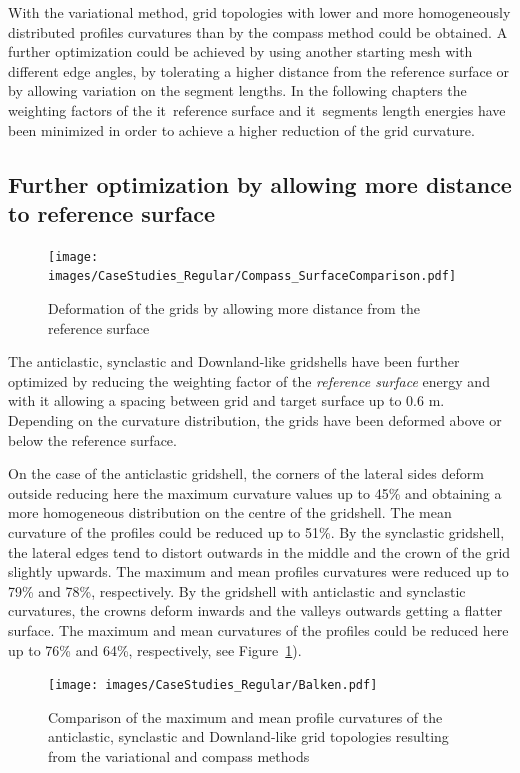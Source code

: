 \documentclass[Thesis.tex]{subfiles}
\begin{document}
With the variational method, grid topologies with lower and more homogeneously distributed profiles curvatures than by the compass method could be obtained. A further optimization could be achieved by using another starting mesh with different edge angles, by tolerating a higher distance from the reference surface or by allowing variation on the segment lengths. In the following chapters the weighting factors of the {it\ reference surface} and {it\ segments length} energies have been minimized in order to achieve a higher reduction of the grid curvature.

\subsection{Further optimization by allowing more distance to reference surface}

\begin{figure}
\centering
\texttt{[image: images/CaseStudies\_Regular/Compass\_SurfaceComparison.pdf]}
\caption{Deformation of the grids by allowing more distance from the reference surface}
\label{fig:Compass_SurfaceComparison}
\end{figure}

The anticlastic, synclastic and Downland-like gridshells have been further optimized by reducing the weighting factor of the {\it reference surface} energy and with it allowing a spacing between grid and target surface up to 0.6 m. Depending on the curvature distribution, the grids have been deformed above or below the reference surface.

On the case of the anticlastic gridshell, the corners of the lateral sides deform outside reducing here the maximum curvature values up to 45\% and obtaining a more homogeneous distribution on the centre of the gridshell. The mean curvature of the profiles could be reduced up to 51\%. By the synclastic gridshell, the lateral edges tend to distort outwards in the middle and the crown of the grid slightly upwards. The maximum and mean profiles curvatures were reduced up to 79\% and 78\%, respectively. By the gridshell with anticlastic and synclastic curvatures, the crowns deform inwards and the valleys outwards getting a flatter surface. The maximum and mean curvatures of the profiles could be reduced here up to 76\% and 64\%, respectively, see Figure~\ref{fig:Compass_SurfaceComparison}).

\begin{figure}
\centering
\texttt{[image: images/CaseStudies\_Regular/Balken.pdf]}
\caption{Comparison of the maximum and mean profile curvatures of the anticlastic, synclastic and Downland-like grid topologies resulting from the variational and compass methods}
\label{fig:Balken}
\end{figure}
\end{document}

